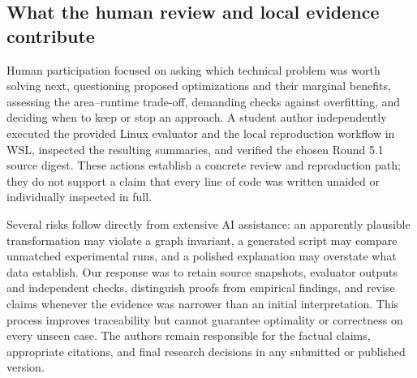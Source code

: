 \subsection{What the human review and local evidence contribute}
Human participation focused on asking which technical problem was worth solving next, questioning proposed optimizations and their marginal benefits, assessing the area--runtime trade-off, demanding checks against overfitting, and deciding when to keep or stop an approach. A student author independently executed the provided Linux evaluator and the local reproduction workflow in WSL, inspected the resulting summaries, and verified the chosen Round 5.1 source digest. These actions establish a concrete review and reproduction path; they do not support a claim that every line of code was written unaided or individually inspected in full.

Several risks follow directly from extensive AI assistance: an apparently plausible transformation may violate a graph invariant, a generated script may compare unmatched experimental runs, and a polished explanation may overstate what data establish. Our response was to retain source snapshots, evaluator outputs and independent checks, distinguish proofs from empirical findings, and revise claims whenever the evidence was narrower than an initial interpretation. This process improves traceability but cannot guarantee optimality or correctness on every unseen case. The authors remain responsible for the factual claims, appropriate citations, and final research decisions in any submitted or published version.

